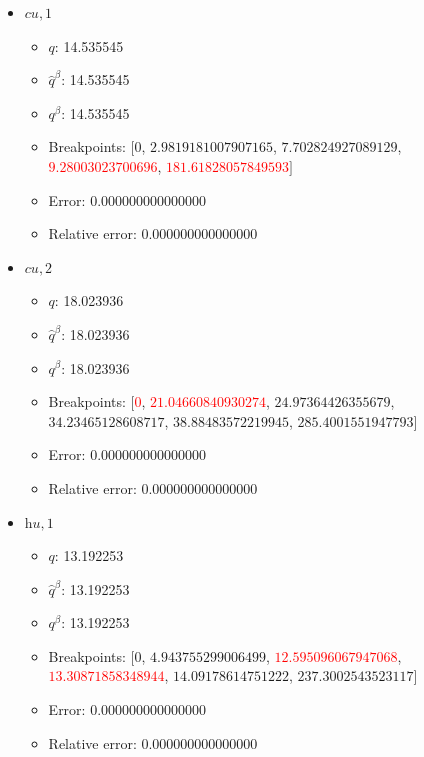 \documentclass{article}%
\begin{document}
\begin{itemize}
\begin{itemize}
		\item $\hat{q}^\beta$: 44.259377%
		\item $q^\beta$: 44.259377%
		\item Breakpoints: $[$$0$, $2.171589371244973$, \textcolor{red}{$38.943261778500734$}, \textcolor{red}{$390.0$}$]$%
		\item Error: 0.000000000000000%
		\item Relative error: 0.000000000000000%
	\end{itemize}%
	\item $\textit{cu},1$%
	\begin{itemize}%
		\item $q$: 14.535545%
		\item $\hat{q}^\beta$: 14.535545%
		\item $q^\beta$: 14.535545%
		\item Breakpoints: $[$$0$, $2.9819181007907165$, $7.702824927089129$, \textcolor{red}{$9.28003023700696$}, \textcolor{red}{$181.61828057849593$}$]$%
		\item Error: 0.000000000000000%
		\item Relative error: 0.000000000000000%
	\end{itemize}%
	\item $\textit{cu},2$%
	\begin{itemize}%
		\item $q$: 18.023936%
		\item $\hat{q}^\beta$: 18.023936%
		\item $q^\beta$: 18.023936%
		\item Breakpoints: $[$\textcolor{red}{$0$}, \textcolor{red}{$21.04660840930274$}, $24.97364426355679$, $34.23465128608717$, $38.88483572219945$, $285.4001551947793$$]$%
		\item Error: 0.000000000000000%
		\item Relative error: 0.000000000000000%
	\end{itemize}%
	\item $\textit{hu},1$%
	\begin{itemize}%
		\item $q$: 13.192253%
		\item $\hat{q}^\beta$: 13.192253%
		\item $q^\beta$: 13.192253%
		\item Breakpoints: $[$$0$, $4.943755299006499$, \textcolor{red}{$12.595096067947068$}, \textcolor{red}{$13.30871858348944$}, $14.09178614751222$, $237.3002543523117$$]$%
		\item Error: 0.000000000000000%
		\item Relative error: 0.000000000000000%
	\end{itemize}%
\end{itemize}%
\end{document}
